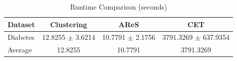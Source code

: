 \begin{table}[htbp]
\centering
\caption{Runtime Comparison (seconds)}
\label{tab:runtime_comparison}
\begin{tabular}{lccc}
\toprule
Dataset & Clustering & AReS & CET \\
\midrule
Diabetes & 12.8255 $\pm$ 3.6214 & 10.7791 $\pm$ 2.1756 & 3791.3269 $\pm$ 637.9354 \\
\midrule
Average & 12.8255 & 10.7791 & 3791.3269 \\
\bottomrule
\end{tabular}
\end{table}